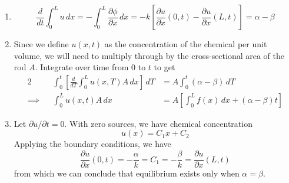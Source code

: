 \documentclass[a4paper]{article}
\begin{document}
\begin{enumerate}[label=(\alph*)]
	\item \[
		\frac{d }{dt}\int^{L}_{0} u \, dx = -\int^{L}_{0} \frac{\partial \phi}{\partial x} \, dx = -k \!\left[ \frac{\partial u}{\partial x}\!\left( 0,t \right) - \frac{\partial u}{\partial x}\!\left( L,t \right) \right] = \alpha - \beta
	\]
	\item Since we define \( u \!\left( x,t \right) \) as the concentration of the chemical per unit volume, we will need to multiply through by the cross-sectional area of the rod \( A \). Integrate over time from \( 0 \) to \( t \) to get
	\begin{alignat*}{2}
		&& \int^{t}_{0} \!\left[ \frac{d }{dT}\int^{L}_{0} u \!\left( x,T \right)A \, dx  \right] \, dT & = A \int^{t}_{0} \!\left( \alpha - \beta \right) \, dT \\
		\implies && \int^{L}_{0} u \!\left( x,t \right)A \, dx & = A \!\left[ \int^{L}_{0} f \!\left( x \right) \, dx + \!\left( \alpha - \beta \right)t \right]
	\end{alignat*}
	\item Let \( \partial u / \partial t = 0 \). With zero sources, we have chemical concentration
	\[
		u \!\left( x \right) = C_{1}x + C_{2}
	\]
	Applying the boundary conditions, we have
	\[
		\frac{\partial u}{\partial x}\!\left( 0,t \right) = -\frac{\alpha}{k} = C_{1} = -\frac{\beta}{k} = \frac{\partial u}{\partial x}\!\left( L,t \right) 
	\]
	from which we can conclude that equilibrium exists only when \( \alpha = \beta \).
\end{enumerate}

\newpage
\end{document}

